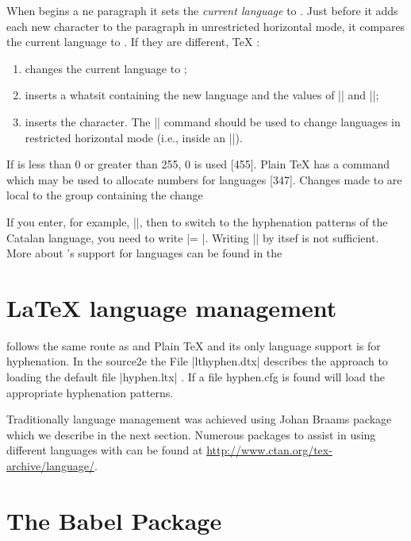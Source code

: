 When \tex begins a ne paragraph it sets the \emph{current language} to . Just before it adds each new character to the paragraph in unrestricted horizontal mode, it compares the current language to \cmd{\language}. If they are different, TeX : 

\begin{enumerate}{}

\item changes the current language to \cmd{\language}; 

\item inserts a whatsit containing the new language and the values of |\lefthyphenmin| and |\righthyphenmin|; 

\item inserts the character. The |\setlanguage| command should be used to change languages in restricted horizontal mode (i.e., inside an |\hbox|). 
\end{enumerate}
If  is less than 0 or greater than 255, 0 is used [455].
  Plain TeX has a  command which may be used to allocate numbers for languages [347]. Changes made to  are local to the group containing the change 
  
If you enter, for example, |\newlanguage\Catalan|, then to switch to the hyphenation patterns of the Catalan language, you need to write |\language = \Catalan|. Writing |\Catalan| by itsef is not sufficient. 
More about \tex's support for languages can be found in the 

\section{LaTeX language management}

\latexe follows the same route as \tex and Plain TeX and its only language support is for hyphenation.
In the source2e the File |lthyphen.dtx| describes the approach to loading the default file |hyphen.ltx| . If a file hyphen.cfg is found \latexe will load the appropriate hyphenation patterns. 

Traditionally language management was achieved using Johan 
Braams package  which we describe in the next section. Numerous packages to assist in using different languages with \latex can be found at \url{http://www.ctan.org/tex-archive/language/}. 

\section{The Babel Package} 

